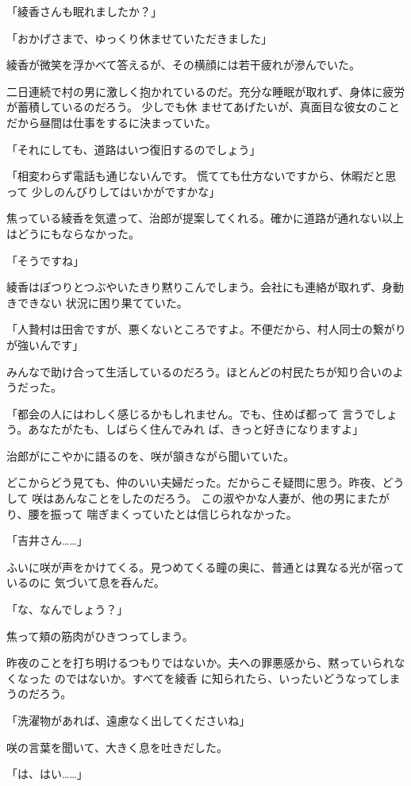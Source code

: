﻿\documentclass[
    book,tate,
    line_length=30zw,
    jafontsize=12pt,
    paper=b5j,
    landscape,
    ]{jlreq}
\begin{document}
「綾香さんも眠れましたか？」

「おかげさまで、ゆっくり休ませていただきました」

綾香が微笑を浮かべて答えるが、その横顔には若干疲れが滲んでいた。

二日連続で村の男に激しく抱かれているのだ。充分な睡眠が取れず、身体に疲労が蓄積しているのだろう。
少しでも休 ませてあげたいが、真面目な彼女のことだから昼間は仕事をするに決まっていた。

「それにしても、道路はいつ復旧するのでしょう」

「相変わらず電話も通じないんです。 慌てても仕方ないですから、休暇だと思って
少しのんびりしてはいかがですかな」

焦っている綾香を気遣って、治郎が提案してくれる。確かに道路が通れない以上はどうにもならなかった。

「そうですね」

綾香はぽつりとつぶやいたきり黙りこんでしまう。会社にも連絡が取れず、身動きできない
状況に困り果てていた。

「人贄村は田舎ですが、悪くないところですよ。不便だから、村人同士の繋がりが強いんです」

みんなで助け合って生活しているのだろう。ほとんどの村民たちが知り合いのようだった。

「都会の人にはわしく感じるかもしれません。でも、住めば都って
言うでしょう。あなたがたも、しばらく住んでみれ ば、きっと好きになりますよ」

治郎がにこやかに語るのを、咲が頷きながら聞いていた。

どこからどう見ても、仲のいい夫婦だった。だからこそ疑問に思う。昨夜、どうして
咲はあんなことをしたのだろう。 この淑やかな人妻が、他の男にまたがり、腰を振って
喘ぎまくっていたとは信じられなかった。

「吉井さん……」

ふいに咲が声をかけてくる。見つめてくる瞳の奥に、普通とは異なる光が宿っているのに
気づいて息を呑んだ。

「な、なんでしょう？」

焦って頬の筋肉がひきつってしまう。

昨夜のことを打ち明けるつもりではないか。夫への罪悪感から、黙っていられなくなった
のではないか。すべてを綾香 に知られたら、いったいどうなってしまうのだろう。

「洗濯物があれば、遠慮なく出してくださいね」

咲の言葉を聞いて、大きく息を吐きだした。

「は、はい……」
\end{document}
